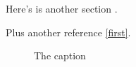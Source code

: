 %
%
%
%


\startdocument			%
%
%

Here's is another section \label{second}.

%
% 
Plus another reference \ref{first}.

\begin{figure}
\caption{The caption}
\end{figure}

%
%
